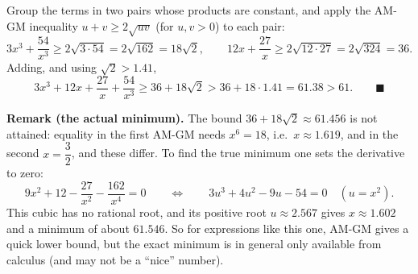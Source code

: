 Group the terms in two pairs whose products are constant, and apply the AM-GM inequality $u+v\ge2\sqrt{uv}$ (for $u,v>0$) to each pair:
\[
3x^3+\dfrac{54}{x^3}\ge2\sqrt{3\cdot54}=2\sqrt{162}=18\sqrt2,\qquad 12x+\dfrac{27}{x}\ge2\sqrt{12\cdot27}=2\sqrt{324}=36 .
\]
Adding, and using $\sqrt2>1.41$,
\[
3x^3+12x+\dfrac{27}{x}+\dfrac{54}{x^3}\ge36+18\sqrt2>36+18\cdot1.41=61.38>61 .\qquad\blacksquare
\]

\textbf{Remark (the actual minimum).} The bound $36+18\sqrt2\approx61.456$ is not attained: equality in the first AM-GM needs $x^6=18$, i.e.\ $x\approx1.619$, and in the second $x=\dfrac{3}{2}$, and these differ. To find the true minimum one sets the derivative to zero:
\[
9x^2+12-\dfrac{27}{x^2}-\dfrac{162}{x^4}=0\qquad\Longleftrightarrow\qquad3u^3+4u^2-9u-54=0\quad\left(u=x^2\right).
\]
This cubic has no rational root, and its positive root $u\approx2.567$ gives $x\approx1.602$ and a minimum of about $61.546$. So for expressions like this one, AM-GM gives a quick lower bound, but the exact minimum is in general only available from calculus (and may not be a ``nice'' number).
